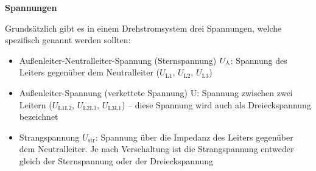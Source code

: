 \begin{frame}


\textbf{Spannungen}

Grundsätzlich gibt es in einem Drehstromsystem drei Spannungen, welche spezifisch genannt werden sollten:

\begin{itemize}
    \item Außenleiter-Neutralleiter-Spannung (Sternspannung) $U_\Stern$: Spannung des Leiters gegenüber dem Neutralleiter ($U_{\mathrm{L1}}$, $U_{\mathrm{L2}}$, $U_{\mathrm{L3}}$)
    \item Außenleiter-Spannung (verkettete Spannung) U: Spannung zwischen zwei Leitern ($U_{\mathrm{L1L2}}$, $U_{\mathrm{L2L3}}$, $U_{\mathrm{L3L1}}$) -- diese Spannung wird auch als Dreieckspannung bezeichnet
    \item Strangspannung $U_{\mathrm{str}}$: Spannung über die Impedanz des Leiters gegenüber dem Neutralleiter. Je nach Verschaltung ist die Strangspannung entweder gleich der Sternspannung oder der Dreieckspannung
\end{itemize}

\end{frame}



